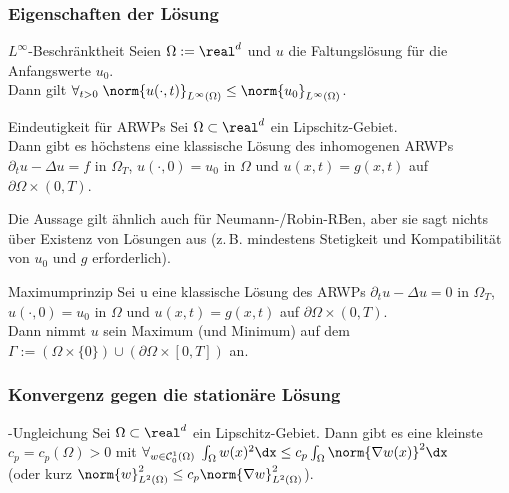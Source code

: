 \pagebreak

\subsubsection{%
    Eigenschaften der Lösung%
}

\begin{Satz}{$L^\infty$-Beschränktheit}
    Seien $\Omega := \real^d$ und $u$ die Faltungslösung für die Anfangswerte $u_0$.\\
    Dann gilt $\forall_{t > 0}\;
    \norm{u(\cdot, t)}_{L^\infty(\Omega)} \le \norm{u_0}_{L^\infty(\Omega)}$.
\end{Satz}

\linie

\begin{Satz}{Eindeutigkeit für ARWPs}
    Sei $\Omega \subset \real^d$ ein Lipschitz-Gebiet.\\
    Dann gibt es höchstens eine klassische Lösung des inhomogenen ARWPs\\
    $\partial_t u - \Delta u = f$ in $\Omega_T$,
    $u(\cdot, 0) = u_0$ in $\Omega$ und $u(x, t) = g(x, t)$ auf $\partial\Omega \times (0, T)$.
\end{Satz}

\begin{Bem}
    Die Aussage gilt ähnlich auch für Neumann-/Robin-RBen, aber sie sagt nichts über Existenz
    von Lösungen aus
    (z.\,B. mindestens Stetigkeit und Kompatibilität von $u_0$ und $g$ erforderlich).
\end{Bem}

\linie

\begin{Satz}{Maximumprinzip}
    Sei u eine klassische Lösung des ARWPs
    $\partial_t u - \Delta u = 0$ in $\Omega_T$,\\
    $u(\cdot, 0) = u_0$ in $\Omega$ und $u(x, t) = g(x, t)$ auf $\partial\Omega \times (0, T)$.\\
    Dann nimmt $u$ sein Maximum (und Minimum) auf dem
    \\
    $\Gamma := (\Omega \times \{0\}) \cup (\partial\Omega \times [0, T])$ an.
\end{Satz}

\subsubsection{%
    Konvergenz gegen die stationäre Lösung%
}

\begin{Satz}{-Ungleichung}
    Sei $\Omega \subset \real^d$ ein Lipschitz-Gebiet.
    Dann gibt es eine kleinste
     $c_p = c_p(\Omega) > 0$ mit
    $\forall_{w \in \C^1_0(\Omega)}\;
    \int_\Omega w(x)^2 \dx \le c_p \int_\Omega \norm{\nabla w(x)}^2 \dx$\\
    (oder kurz $\norm{w}_{L^2(\Omega)}^2 \le c_p \norm{\nabla w}_{L^2(\Omega)}^2$).
\end{Satz}

